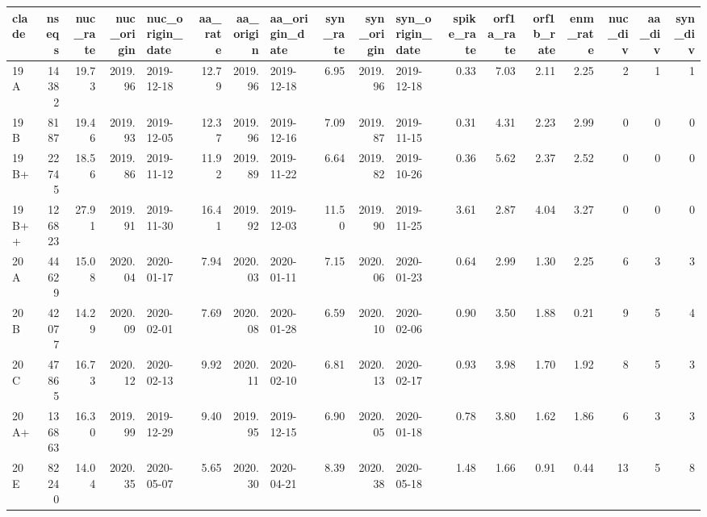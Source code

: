 \begin{tabular}{lrrrlrrlrrlrrrrrrr}
\toprule
clade &  nseqs &  nuc\_rate &  nuc\_origin & nuc\_origin\_date &  aa\_rate &  aa\_origin & aa\_origin\_date &  syn\_rate &  syn\_origin & syn\_origin\_date &  spike\_rate &  orf1a\_rate &  orf1b\_rate &  enm\_rate &  nuc\_div &  aa\_div &  syn\_div \\
\midrule
  19A &  14382 &     19.73 &     2019.96 &      2019-12-18 &    12.79 &    2019.96 &     2019-12-18 &      6.95 &     2019.96 &      2019-12-18 &        0.33 &        7.03 &        2.11 &      2.25 &        2 &       1 &        1 \\
  19B &   8187 &     19.46 &     2019.93 &      2019-12-05 &    12.37 &    2019.96 &     2019-12-16 &      7.09 &     2019.87 &      2019-11-15 &        0.31 &        4.31 &        2.23 &      2.99 &        0 &       0 &        0 \\
 19B+ &  22745 &     18.56 &     2019.86 &      2019-11-12 &    11.92 &    2019.89 &     2019-11-22 &      6.64 &     2019.82 &      2019-10-26 &        0.36 &        5.62 &        2.37 &      2.52 &        0 &       0 &        0 \\
19B++ & 126823 &     27.91 &     2019.91 &      2019-11-30 &    16.41 &    2019.92 &     2019-12-03 &     11.50 &     2019.90 &      2019-11-25 &        3.61 &        2.87 &        4.04 &      3.27 &        0 &       0 &        0 \\
  20A &  44629 &     15.08 &     2020.04 &      2020-01-17 &     7.94 &    2020.03 &     2020-01-11 &      7.15 &     2020.06 &      2020-01-23 &        0.64 &        2.99 &        1.30 &      2.25 &        6 &       3 &        3 \\
  20B &  42077 &     14.29 &     2020.09 &      2020-02-01 &     7.69 &    2020.08 &     2020-01-28 &      6.59 &     2020.10 &      2020-02-06 &        0.90 &        3.50 &        1.88 &      0.21 &        9 &       5 &        4 \\
  20C &  47865 &     16.73 &     2020.12 &      2020-02-13 &     9.92 &    2020.11 &     2020-02-10 &      6.81 &     2020.13 &      2020-02-17 &        0.93 &        3.98 &        1.70 &      1.92 &        8 &       5 &        3 \\
 20A+ & 136863 &     16.30 &     2019.99 &      2019-12-29 &     9.40 &    2019.95 &     2019-12-15 &      6.90 &     2020.05 &      2020-01-18 &        0.78 &        3.80 &        1.62 &      1.86 &        6 &       3 &        3 \\
  20E &  82240 &     14.04 &     2020.35 &      2020-05-07 &     5.65 &    2020.30 &     2020-04-21 &      8.39 &     2020.38 &      2020-05-18 &        1.48 &        1.66 &        0.91 &      0.44 &       13 &       5 &        8 \\

\end{tabular}
